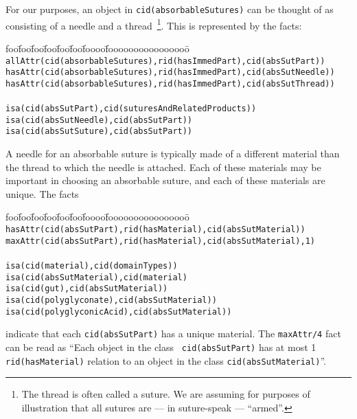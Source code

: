 \begin{example} \rm  \label{ex:maxAttr}
For our purposes, an object in {\tt cid(absorbableSutures)} can be
thought of as consisting of a needle and a thread~\footnote{The thread
is often called a suture.  We are assuming for purposes of
illustration that all sutures are --- in suture-speak --- ``armed''.}.  This is
represented by the facts:
%
{\small
\begin{tabbing}
foo\=foo\=foo\=foo\=foo\=foo\=foooo\=foooooooooooooooo\=\kill
\> {\tt allAttr(cid(absorbableSutures),rid(hasImmedPart),cid(absSutPart)) } \\
\> {\tt hasAttr(cid(absorbableSutures),rid(hasImmedPart),cid(absSutNeedle)) } \\
\> {\tt hasAttr(cid(absorbableSutures),rid(hasImmedPart),cid(absSutThread)) } \\
\\
\> {\tt isa(cid(absSutPart),cid(suturesAndRelatedProducts))}  \\
\> \> {\tt isa(cid(absSutNeedle),cid(absSutPart)) } \\
\> \> {\tt isa(cid(absSutSuture),cid(absSutPart)) } 
\end{tabbing}
}
%
\noindent
A needle for an absorbable suture is typically made of a different
material than the thread to which the needle is attached.  Each of
these materials may be important in choosing an absorbable suture, and
each of these materials are unique.  The facts
%
{\small
\begin{tabbing}
foo\=foo\=foo\=foo\=foo\=foo\=foooo\=foooooooooooooooo\=\kill
\> {\tt hasAttr(cid(absSutPart),rid(hasMaterial),cid(absSutMaterial)) } \\
\> {\tt maxAttr(cid(absSutPart),rid(hasMaterial),cid(absSutMaterial),1) } \\
\\
\> {\tt isa(cid(material),cid(domainTypes))} \\
\> {\tt isa(cid(absSutMaterial),cid(material)} \\
\> {\tt isa(cid(gut),cid(absSutMaterial))} \\
\> {\tt isa(cid(polyglyconate),cid(absSutMaterial))} \\
\> {\tt isa(cid(polyglyconicAcid),cid(absSutMaterial)) } 
\end{tabbing}
}
%
\noindent
indicate that each {\tt cid(absSutPart)} has a unique material.  The
{\tt maxAttr/4} fact can be read as ``Each object in the class {\tt
cid(absSutPart)} has at most 1 {\tt rid(hasMaterial)} relation to an
object in the class {\tt cid(absSutMaterial)}''.
\end{example}

